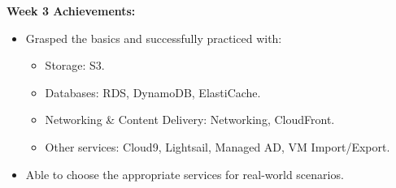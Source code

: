 \vspace{0.5em}\noindent\textbf{Week 3 Achievements:}\par

\begin{itemize}
\tightlist
\item
  Grasped the basics and successfully practiced with:

  \begin{itemize}
  \tightlist
  \item
    Storage: S3.
  \item
    Databases: RDS, DynamoDB, ElastiCache.
  \item
    Networking \& Content Delivery: Networking, CloudFront.
  \item
    Other services: Cloud9, Lightsail, Managed AD, VM Import/Export.
  \end{itemize}
\item
  Able to choose the appropriate services for real-world scenarios.
\end{itemize}
